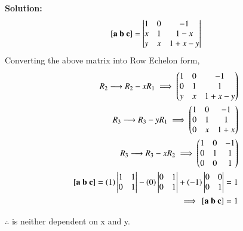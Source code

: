 \documentclass[journal]{IEEEtran}
\begin{document}
\textbf{Solution:}\\
\begin{align}
\sbrak{\vec{a}\ \vec{b}\ \vec{c}}=\left|\begin{matrix}1&0&-1\\x&1&1-x\\y&x&1+x-y\end{matrix}\right|
 \end{align}
 Converting the above matrix into Row Echelon form,
\begin{align}
    R_{2} \longrightarrow R_{2}-xR_{1}  \implies \myvec{1 & 0 &-1\\0 & 1 & 1\\y & x & 1+x-y}\\
    R_{3} \longrightarrow R_{3}-yR_{1}\implies \myvec{1 & 0 &-1\\0 & 1 & 1\\0 & x & 1+x}\\
      R_{3} \longrightarrow R_{3}-xR_{2} \implies \myvec{1 & 0 &-1\\0 & 1 & 1\\0 & 0 & 1}\\
\sbrak{\Vec{a} \ \Vec{b} \ \Vec{c}}= \brak{1}\left|\begin{matrix}1&1\\0&1\end{matrix}\right|-\brak{0}\left|\begin{matrix}0&1\\0&1\end{matrix}\right|+\brak{-1}\left|\begin{matrix}0&0\\0&1\end{matrix}\right|=1\\
\implies \sbrak{\Vec{a} \ \Vec{b} \ \Vec{c}}= 1
\end{align}

\begin{center}
    $\therefore$  is neither dependent on x and y.
\end{center}
  
\end{document}

